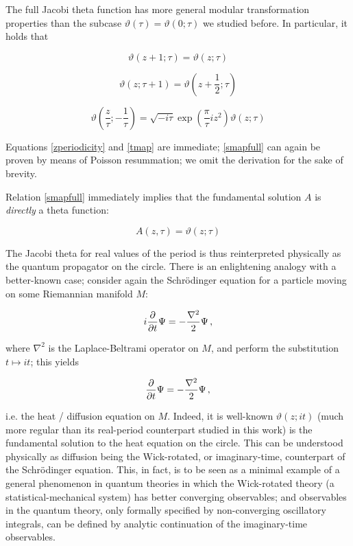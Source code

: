 \documentclass{article}
\newcommand{\T}{\ensuremath{\vartheta}}
\begin{document}
The full Jacobi theta function has more general modular transformation properties than the subcase $\vartheta(\tau) = \vartheta(0;\tau)$ we studied before. In particular, it holds that

\begin{equation} \label{zperiodicity}
    \vartheta(z+1;\tau) = \vartheta(z;\tau)
\end{equation}

\begin{equation} \label{tmap}
    \vartheta(z;\tau + 1) = \vartheta(z+\frac{1}{2}; \tau)
\end{equation}

\begin{equation}\label{smapfull}
    \vartheta\left(\frac{z}{\tau}; -\frac{1}{\tau} \right) = \sqrt{-i\tau} \exp(\frac{\pi}{\tau} i z^2) \T(z;\tau)
\end{equation}

Equations \eqref{zperiodicity} and \eqref{tmap} are immediate; \eqref{smapfull} can again be proven by means of Poisson resummation\cite{thetamodular}; we omit the derivation for the sake of brevity.

Relation \eqref{smapfull} immediately implies that the fundamental solution $A$ is \emph{directly} a theta function:

\begin{equation}
    A(z,\tau) = \vartheta(z;\tau)
\end{equation}

The Jacobi theta for real values of the period is thus reinterpreted physically as the quantum propagator on the circle. There is an enlightening analogy with a better-known case; consider again the Schr\"odinger equation for a particle moving on some Riemannian manifold $M$:

\begin{equation}
    i \pdv{t} \Psi = - \frac{\nabla^2}{2} \Psi\,,
\end{equation}

where $\nabla^2$ is the Laplace-Beltrami operator on $M$, and perform the substitution $t \mapsto it$; this yields

\begin{equation}
    \pdv{t} \Psi = - \frac{\nabla^2}{2} \Psi\,,
\end{equation}

i.e. the heat / diffusion equation on $M$. Indeed, it is well-known $\vartheta(z;it)$ (much more regular than its real-period counterpart studied in this work) is the fundamental solution to the heat equation on the circle. This can be understood physically as diffusion being the Wick-rotated, or imaginary-time, counterpart of the Schr\"odinger equation. This, in fact, is to be seen as a minimal example of a general phenomenon in quantum theories in which the Wick-rotated theory (a statistical-mechanical system) has better converging observables; and observables in the quantum theory, only formally specified by non-converging oscillatory integrals, can be defined by analytic continuation of the imaginary-time observables.
\end{document}
